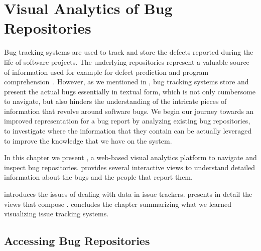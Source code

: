 



\chapter{Visual Analytics of Bug Repositories}\label{ch:visualize}


Bug tracking systems are used to track and store the defects reported during the life of software projects.
The underlying repositories represent a valuable source of information used for example for defect prediction and program comprehension~\cite{stor1999a}.
However, as we mentioned in , bug tracking systems store and present the actual bugs essentially in textual form, which is not only cumbersome to navigate, but also hinders the understanding of the intricate pieces of information that revolve around software bugs.
We begin our journey towards an improved representation for a bug report by analyzing existing bug repositories, to investigate where the information that they contain can be actually leveraged to improve the knowledge that we have on the system.

In this chapter we present \ib, a web-based visual analytics platform to navigate and inspect bug repositories.
\ib provides several interactive views to understand detailed information about the bugs and the people that report them.


\structure

 introduces the issues of dealing with data in issue trackers.
 presents in detail the views that compose \ib.
 concludes the chapter summarizing what we learned visualizing issue tracking systems.


\newpage

\section{Accessing Bug Repositories}\label{sec:visualize-intro}

